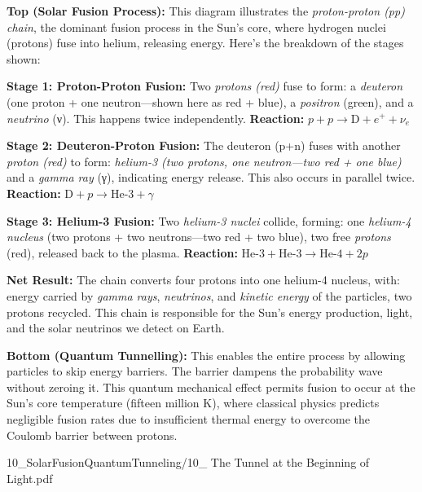 \begin{SideNotePage}{
  \textbf{Top (Solar Fusion Process):} This diagram illustrates the \emph{proton-proton (pp) chain}, the dominant fusion process in the Sun's core, where hydrogen nuclei (protons) fuse into helium, releasing energy. Here's the breakdown of the stages shown: \par
  \textbf{Stage 1: Proton-Proton Fusion:} Two \emph{protons (red)} fuse to form: a \emph{deuteron} (one proton + one neutron—shown here as red + blue), a \emph{positron} (green), and a \emph{neutrino} ({\greekfont ν}). This happens twice independently. \textbf{Reaction:} $p + p \rightarrow \text{D} + e^+ + \nu_e$ \par
  \textbf{Stage 2: Deuteron-Proton Fusion:} The deuteron (p+n) fuses with another \emph{proton (red)} to form: \emph{helium-3 (two protons, one neutron—two red + one blue)} and a \emph{gamma ray} ({\greekfont γ}), indicating energy release. This also occurs in parallel twice. \textbf{Reaction:} $\text{D} + p \rightarrow \text{He-3} + \gamma$ \par
  \textbf{Stage 3: Helium-3 Fusion:} Two \emph{helium-3 nuclei} collide, forming: one \emph{helium-4 nucleus} (two protons + two neutrons—two red + two blue), two free \emph{protons} (red), released back to the plasma. \textbf{Reaction:} $\text{He-3} + \text{He-3} \rightarrow \text{He-4} + 2p$ \par
  \textbf{Net Result:} The chain converts four protons into one helium-4 nucleus, with: energy carried by \emph{gamma rays}, \emph{neutrinos}, and \emph{kinetic energy} of the particles, two protons recycled. This chain is responsible for the Sun's energy production, light, and the solar neutrinos we detect on Earth. \par
  \textbf{Bottom (Quantum Tunnelling):} This enables the entire process by allowing particles to skip energy barriers. The barrier dampens the probability wave without zeroing it. This quantum mechanical effect permits fusion to occur at the Sun's core temperature (fifteen million K), where classical physics predicts negligible fusion rates due to insufficient thermal energy to overcome the Coulomb barrier between protons. \par
}{10_SolarFusionQuantumTunneling/10_ The Tunnel at the Beginning of Light.pdf}
\end{SideNotePage}
